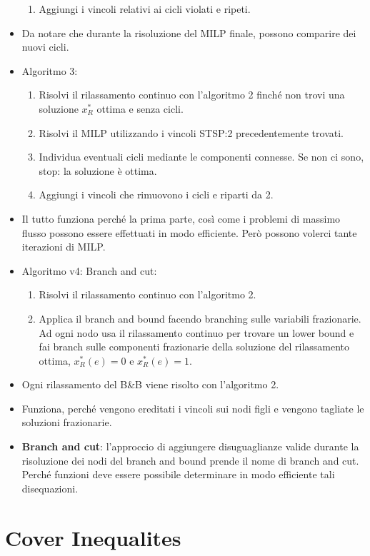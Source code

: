 \begin{itemize}
\begin{enumerate}
		\item Aggiungi i vincoli relativi ai cicli violati e ripeti.
	\end{enumerate}
	\item Da notare che durante la risoluzione del MILP finale, possono comparire dei nuovi cicli.
	\item Algoritmo 3:
	\begin{enumerate}
		\item Risolvi il rilassamento continuo con l'algoritmo 2 finché non trovi una soluzione $x_{R}^*$ ottima e senza cicli.
		\item Risolvi il MILP utilizzando i vincoli STSP:2 precedentemente trovati.
		\item Individua eventuali cicli mediante le componenti connesse. Se non ci sono, stop: la soluzione è ottima.
		\item Aggiungi i vincoli che rimuovono i cicli e riparti da 2.
	\end{enumerate}
	\item Il tutto funziona perché la prima parte, così come i problemi di massimo flusso possono essere effettuati in modo efficiente. Però possono volerci tante iterazioni di MILP.
	\item Algoritmo v4: Branch and cut:
	\begin{enumerate}
		\item Risolvi il rilassamento continuo con l'algoritmo 2.
		\item Applica il branch and bound facendo branching sulle variabili frazionarie. Ad ogni nodo usa il rilassamento continuo per trovare un lower bound e fai branch sulle componenti frazionarie della soluzione del rilassamento ottima, $x_{R}^*(e) = 0$ e $x_{R}^*(e) = 1$.
	\end{enumerate}
	\item Ogni rilassamento del B\&B viene risolto con l'algoritmo 2.
	\item Funziona, perché vengono ereditati i vincoli sui nodi figli e vengono tagliate le soluzioni frazionarie.
	\item \textbf{Branch and cut}: l'approccio di aggiungere disuguaglianze valide durante la risoluzione dei nodi del branch and bound prende il nome di branch and cut. Perché funzioni deve essere possibile determinare in modo efficiente tali disequazioni.
\end{itemize}

\section{Cover Inequalites}


